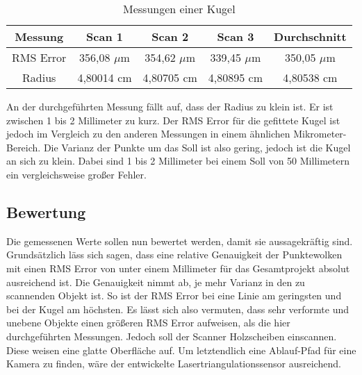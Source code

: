 		\begin{table}[h]
			\centering
			
			\begin{tabular}[h]{c|c|c|c||c}
				Messung & Scan 1 & Scan 2 & Scan 3 & Durchschnitt \\
				\hline
				RMS Error & 356,08 $\mu$m & 354,62 $\mu$m & 339,45 $\mu$m & 350,05 $\mu$m \\
				\hline
				Radius & 4,80014 cm & 4,80705 cm & 4,80895 cm & 4,80538 cm \\
				\hline
			\end{tabular}
		
			\caption{Messungen einer Kugel}
			\label{tab:sphere}
			
		\end{table}
	
		An der durchgeführten Messung fällt auf, dass der Radius zu klein ist. Er ist zwischen 1 bis 2 Millimeter zu kurz. Der RMS Error für die gefittete Kugel ist jedoch im Vergleich zu den anderen Messungen in einem ähnlichen Mikrometer-Bereich. Die Varianz der Punkte um das \glqq Soll\grqq{} ist also gering, jedoch ist die Kugel an sich zu klein. Dabei sind 1 bis 2 Millimeter bei einem Soll von 50 Millimetern ein vergleichsweise großer Fehler. 
		
		\subsection{Bewertung}
		
		Die gemessenen Werte sollen nun bewertet werden, damit sie aussagekräftig sind. Grundsätzlich läss sich sagen, dass eine relative Genauigkeit der Punktewolken mit einen RMS Error von unter einem Millimeter für das Gesamtprojekt absolut ausreichend ist. Die Genauigkeit nimmt ab, je mehr Varianz in den zu scannenden Objekt ist. So ist der RMS Error bei eine Linie am geringsten und bei der Kugel am höchsten. Es lässt sich also vermuten, dass sehr verformte und unebene Objekte einen größeren RMS Error aufweisen, als die hier durchgeführten Messungen. Jedoch soll der Scanner Holzscheiben einscannen. Diese weisen eine glatte Oberfläche auf. Um letztendlich eine Ablauf-Pfad für eine Kamera zu finden, wäre der entwickelte Lasertriangulationssensor ausreichend.

